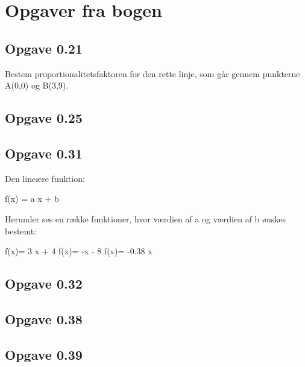 \section{Opgaver fra bogen}

\subsection{Opgave 0.21}
Bestem proportionalitetsfaktoren for den rette linje, som går gennem punkterne A(0,0) og B(3,9).



\subsection{Opgave 0.25}

\subsection{Opgave 0.31}
Den lineære funktion:

f(x) = a \cdot x + b

Herunder ses en række funktioner, hvor værdien af a og værdien af b ønskes bestemt:

f(x)= 3 \cdot x + 4
f(x)= -x - 8
f(x)= -0.38 \cdot x

\subsection{Opgave 0.32}

\subsection{Opgave 0.38}

\subsection{Opgave 0.39}